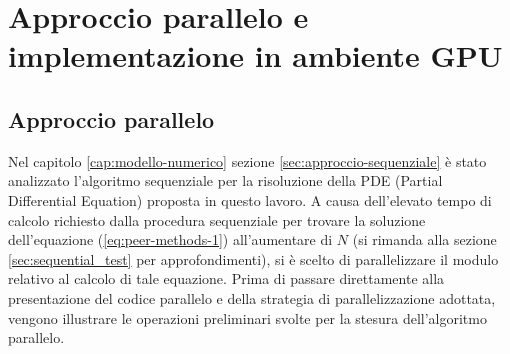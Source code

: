 \def\baselinestretch{1}
\chapter{Approccio parallelo e implementazione in ambiente GPU} \label{cap:approccio-parallelo}
\def\baselinestretch{1.66}

\section{Approccio parallelo} \label{sec:approccio-parallelo}
\noindent Nel capitolo \ref{cap:modello-numerico} sezione \ref{sec:approccio-sequenziale} è stato analizzato l'algoritmo sequenziale per la risoluzione della PDE (Partial Differential Equation) proposta in questo lavoro. A causa dell'elevato tempo di calcolo richiesto dalla procedura sequenziale per trovare la soluzione dell'equazione (\ref{eq:peer-methods-1}) all'aumentare di $N$ (si rimanda alla sezione \ref{sec:sequential_test} per approfondimenti), si è scelto di parallelizzare il modulo relativo al calcolo di tale equazione. Prima di passare direttamente alla presentazione del codice parallelo e della strategia di parallelizzazione adottata, vengono illustrare le operazioni preliminari svolte per la stesura dell'algoritmo parallelo.

